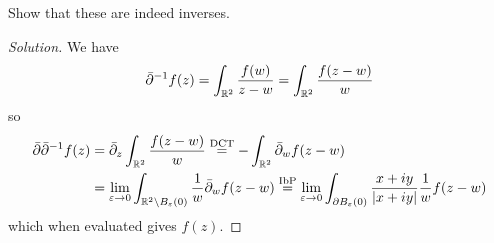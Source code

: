 \begin{exer}
  Show that these are indeed inverses.
\end{exer}

\begin{proof}[Solution]
  We have
  \[ \bar{\partial}^{-1} f(z) = \int_{\mathbb{R}^2} \frac{f(w)}{z-w} = \int_{\mathbb{R}^2} \frac{f(z-w)}{w} \]
  so
  \begin{align*}
    \bar{\partial}\bar{\partial}^{-1} f(z) &= \bar{\partial}_z \int_{\mathbb{R}^2} \frac{f(z-w)}{w} \overset{\text{DCT}}{=} -\int_{\mathbb{R}^2} \bar{\partial}_w f(z-w) \\
    &= \lim_{\varepsilon\to 0} \int_{\mathbb{R}^2 \setminus B_\varepsilon(0)} \frac 1w \bar{\partial}_w f(z-w) \overset{\text{IbP}}= \lim_{\varepsilon\to0} \int_{\partial B_\varepsilon(0)} \frac{x+iy}{\left\lvert x+iy \right\rvert} \frac 1w f(z-w)
  \end{align*}
  which when evaluated gives $f(z)$.
\end{proof}
